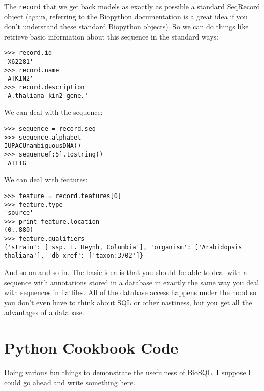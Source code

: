 \documentclass{article}
\begin{document}
The \verb|record| that we get back models as exactly as possible a
standard SeqRecord object (again, referring to the Biopython
documentation is a great idea if you don't understand these standard
Biopython objects). So we can do things like retrieve basic information
about this sequence in the standard ways:

\begin{verbatim}
>>> record.id
'X62281'
>>> record.name
'ATKIN2'
>>> record.description
'A.thaliana kin2 gene.'
\end{verbatim}

We can deal with the sequence:

\begin{verbatim}
>>> sequence = record.seq
>>> sequence.alphabet
IUPACUnambiguousDNA()
>>> sequence[:5].tostring()
'ATTTG'
\end{verbatim}

We can deal with features:

\begin{verbatim}
>>> feature = record.features[0]
>>> feature.type
'source'
>>> print feature.location
(0..880)
>>> feature.qualifiers
{'strain': ['ssp. L. Heynh, Colombia'], 'organism': ['Arabidopsis
thaliana'], 'db_xref': ['taxon:3702']}
\end{verbatim}

And so on and so in. The basic idea is that you should be able to deal
with a sequence with annotations stored in a database in exactly the
same way you deal with sequences in flatfiles. All of the database
access happens under the hood so you don't even have to think about SQL
or other nastiness, but you get all the advantages of a database.


\section{Python Cookbook Code}

Doing various fun things to demonstrate the usefulness of BioSQL. I
suppose I could go ahead and write something here.
\end{document}
